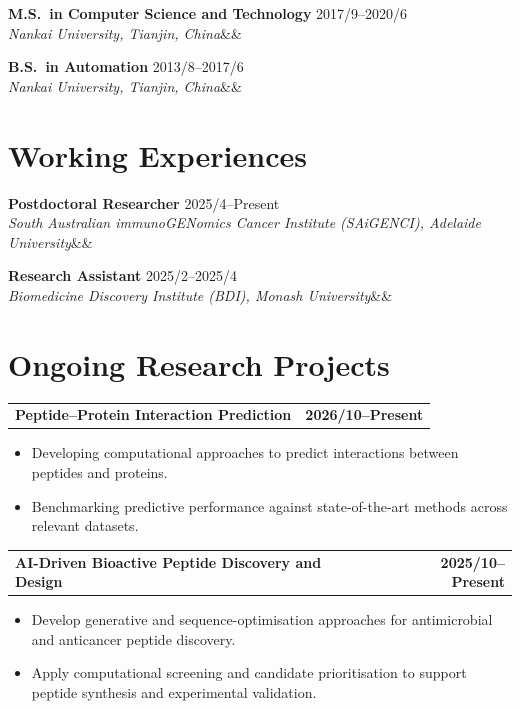 \documentclass[10pt,a4paper]{article}
\makeatletter
\newcommand{\cventry}[4]{%
  \par\addvspace{2pt}%
  \textbf{#1} \hfill #2 \\
  \textit{#3}\ifx&#4&\else \hfill \textit{#4}\fi \par\vspace{2pt}%
}
\newcommand{\projectentry}[2]{%
  \par\addvspace{2pt}%
  \noindent\begin{tabularx}{\textwidth}{@{}>{\raggedright\arraybackslash}X r@{}}
    \textbf{#1} & \textbf{#2}
  \end{tabularx}\par\vspace{-3pt}%
}
\makeatother
\begin{document}
\cventry{M.S.\ in Computer Science and Technology}{2017/9--2020/6}{Nankai University, Tianjin, China}{}
\par

\cventry{B.S.\ in Automation}{2013/8--2017/6}{Nankai University, Tianjin, China}{}
\par

\section{Working Experiences}
\cventry{Postdoctoral Researcher}{2025/4--Present}{South Australian immunoGENomics Cancer Institute (SAiGENCI), Adelaide University}{}
\par
\cventry{Research Assistant}{2025/2--2025/4}{Biomedicine Discovery Institute (BDI), Monash University}{}
\par

\section{Ongoing Research Projects}

\projectentry{Peptide--Protein Interaction Prediction}{2026/10--Present}
\begin{itemize}
  \item Developing computational approaches to predict interactions between peptides and proteins.
  \item Benchmarking predictive performance against state-of-the-art methods across relevant datasets.
\end{itemize}

\projectentry{AI-Driven Bioactive Peptide Discovery and Design}{2025/10--Present}
\begin{itemize}
  \item Develop generative and sequence-optimisation approaches for antimicrobial and anticancer peptide discovery.
  \item Apply computational screening and candidate prioritisation to support peptide synthesis and experimental validation.
\end{itemize}
\end{document}
